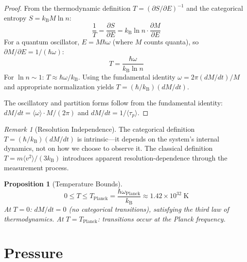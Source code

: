 \documentclass[twocolumn,10pt,a4paper]{article}
\theoremstyle{plain}
\newtheorem{proposition}[theorem]{Proposition}
\theoremstyle{definition}
\theoremstyle{remark}
\newtheorem{remark}[theorem]{Remark}
\newcommand{\kB}{k_{\mathrm{B}}}
\newcommand{\taup}{\tau_p}
\begin{document}
\begin{proof}
From the thermodynamic definition $T = (\partial S/\partial E)^{-1}$ and the categorical entropy $S = \kB M \ln n$:
\begin{equation}
    \frac{1}{T} = \frac{\partial S}{\partial E} = \kB \ln n \cdot \frac{\partial M}{\partial E}
\end{equation}
For a quantum oscillator, $E = M\hbar\omega$ (where $M$ counts quanta), so $\partial M/\partial E = 1/(\hbar\omega)$:
\begin{equation}
    T = \frac{\hbar\omega}{\kB \ln n}
\end{equation}
For $\ln n \sim 1$: $T \approx \hbar\omega/\kB$. Using the fundamental identity $\omega = 2\pi(dM/dt)/M$ and appropriate normalization yields $T = (\hbar/\kB)(dM/dt)$.

The oscillatory and partition forms follow from the fundamental identity: $dM/dt = \langle\omega\rangle \cdot M/(2\pi)$ and $dM/dt = 1/\langle\taup\rangle$.
\end{proof}

\begin{remark}[Resolution Independence]
The categorical definition $T = (\hbar/\kB)(dM/dt)$ is intrinsic---it depends on the system's internal dynamics, not on how we choose to observe it. The classical definition $T = m\langle v^2\rangle/(3\kB)$ introduces apparent resolution-dependence through the measurement process.
\end{remark}

\begin{proposition}[Temperature Bounds]
\label{prop:temp_bounds}
\begin{equation}
    0 \leq T \leq T_{\mathrm{Planck}} = \frac{\hbar\omega_{\mathrm{Planck}}}{\kB} \approx 1.42 \times 10^{32}\;\mathrm{K}
\end{equation}
At $T = 0$: $dM/dt = 0$ (no categorical transitions), satisfying the third law of thermodynamics. At $T = T_{\mathrm{Planck}}$: transitions occur at the Planck frequency.
\end{proposition}

\section{Pressure}
\label{sec:pressure}
\end{document}
